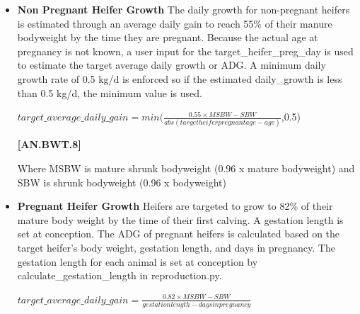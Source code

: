 \begin{refsection}
\begin{itemize}
\begin{center}
    \(target\_average\_daily\_gain = \frac{birth\ weight}{wean\ day}\)
    
\end{center}
    \vspace{0.5cm}
    
    {\raggedleft \textbf{[AN.BWT.7]}\par}
    \vspace{0.5cm}
    
    \item \textbf{Non Pregnant Heifer Growth} The daily growth for non-pregnant heifers is estimated through an average daily gain to reach 55\% of their manure bodyweight by the time they are pregnant. Because the actual age at pregnancy is not known, a user input for the target\_heifer\_preg\_day is used to estimate the target average daily growth or ADG. A minimum daily growth rate of 0.5 kg/d is enforced so if the estimated daily\_growth is less than 0.5 kg/d, the minimum value is used. 
    \vspace{0.5cm}
    
 \begin{center}
    \(target\_average\_daily\_gain = min(\frac{0.55×MSBW-SBW}{abs(target heifer pregnant age-age)}\),0.5)
\end{center}
    \vspace{0.5cm}
    
    {\raggedleft \textbf{[AN.BWT.8]}\par}
    \vspace{0.5cm}
    
    Where MSBW is mature shrunk bodyweight (0.96 x mature bodyweight) and SBW is shrunk bodyweight (0.96 x bodyweight)
    
    \item \textbf{Pregnant Heifer Growth} Heifers are targeted to grow to 82\% of their mature body weight by the time of their first calving. A gestation length is set at conception. The ADG of pregnant heifers is calculated based on the target heifer's body weight, gestation length, and days in pregnancy. The gestation length for each animal is set at conception by calculate\_gestation\_length in reproduction.py.
    \vspace{0.5cm}
 
\begin{center}
    \(target\_average\_daily\_gain = \frac{0.82×MSBW-SBW}{gestation length - days in pregnancy}\)
\end{center}
    \vspace{0.5cm}
    

\end{itemize}
\end{refsection}
